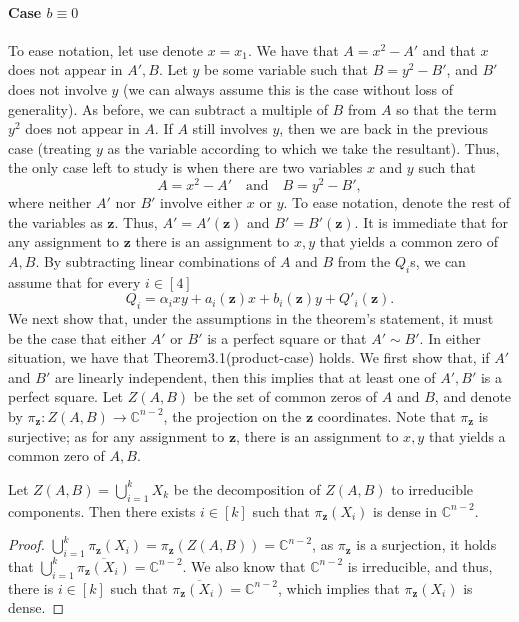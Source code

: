 \paragraph{Case $b\equiv0$}
To ease notation, let use denote $x=x_1$. We have that $A=x^2-A'$ and that $x$ does not appear in $A',B$. Let $y$ be some variable such that $B=y^2-B'$, and $B'$ does not involve $y$ (we can always assume this is the case without loss of generality). As before, we can subtract a multiple of $B$ from $A$ so that the term $y^2$ does not appear in $A$. If $A$ still involves $y$, then we are back in the previous case (treating $y$ as the variable according to which we take the resultant). Thus, the only case left to study is when there are two variables $x$ and $y$ such that
\[A=x^2-A'\quad\text{and}\quad B=y^2-B',\]
where neither $A'$ nor $B'$ involve either $x$ or $y$. To ease notation, denote the rest of the variables as $\mathbf z$. Thus, $A'=A'(\mathbf z)$ and $B'=B'(\mathbf z)$. It is immediate that for any assignment to $\mathbf z$ there is an assignment to $x,y$ that yields a common zero of $A,B$.
By subtracting linear combinations of $A$ and $B$ from the $Q_i$s, we can assume that for every $i\in[4]$
\[Q_i=\alpha_i xy+a_i(\mathbf z)x+b_i(\mathbf z)y+Q'_i(\mathbf z).\]
We next show that, under the assumptions in the theorem's statement, it must be the case that either $A'$ or $B'$ is a perfect square or that $A'\sim B'$. In either situation, we have that Theorem3.1(product-case) holds. We first show that, if $A'$ and $B'$ are linearly independent, then this implies that at least one of $A',B'$ is a perfect square.
Let $Z(A,B)$ be the set of common zeros of $A$ and $B$, and denote by $\pi_{\mathbf z}:Z(A,B)\to\mathbb C^{n-2}$, the projection on the $\mathbf z$ coordinates. Note that $\pi_{\mathbf z}$ is surjective; as for any assignment to $\mathbf z$, there is an assignment to $x,y$ that yields a common zero of $A,B$.
\begin{ntclaim}
Let $Z(A,B)=\bigcup_{i=1}^kX_k$ be the decomposition of $Z(A,B)$ to irreducible components. Then there exists $i\in[k]$ such that $\pi_{\mathbf z}(X_i)$ is dense in $\mathbb C^{n-2}$.
\end{ntclaim}
\begin{proof}
$\bigcup_{i=1}^k\pi_{\mathbf z}(X_i)=\pi_{\mathbf z}(Z(A,B))=\mathbb C^{n-2}$, as $\pi_{\mathbf z}$ is a surjection, it holds that $\bigcup_{i=1}^k\overline{\pi_{\mathbf z}(X_i)}=\mathbb C^{n-2}$. We also know that $\mathbb C^{n-2}$ is irreducible, and thus, there is $i\in[k]$ such that $\overline{\pi_{\mathbf z}(X_i)}=\mathbb C^{n-2}$, which implies that $\pi_{\mathbf z}(X_i)$ is dense.
\end{proof}
